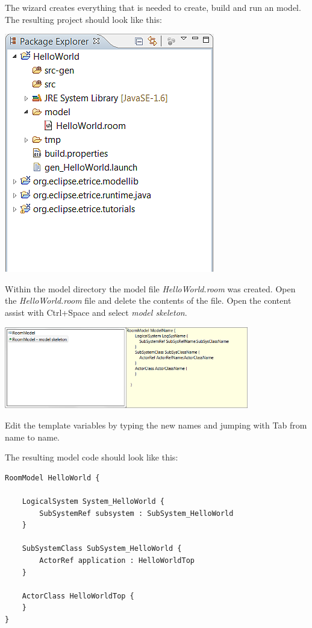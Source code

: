 The wizard creates everything that is needed to create, build and run an \eTrice{} model. The resulting 
project should look like this:

\includegraphics{images/015-HelloWorld11.png}

Within the model directory the model file \textit{HelloWorld.room} was created. Open the 
\textit{HelloWorld.room} file and delete the contents of the file. Open the content assist with Ctrl+Space 
and select \textit{model skeleton}.

\includegraphics[width=0.8\textwidth]{images/015-HelloWorld12.png}

Edit the template variables by typing the new names and jumping with Tab from name to name.

The resulting model code should look like this:

\begin{verbatim}
RoomModel HelloWorld {

    LogicalSystem System_HelloWorld {
        SubSystemRef subsystem : SubSystem_HelloWorld
    }

    SubSystemClass SubSystem_HelloWorld {
        ActorRef application : HelloWorldTop
    }

    ActorClass HelloWorldTop {
    }
} 
\end{verbatim}

